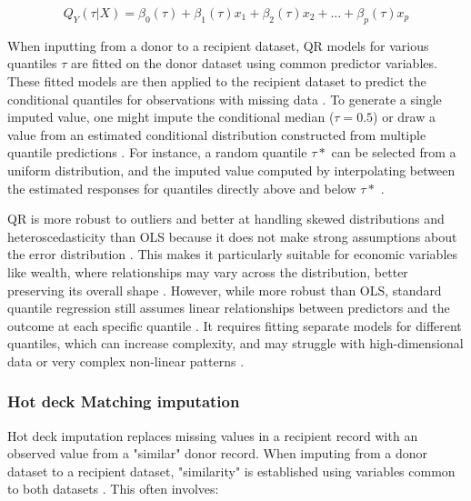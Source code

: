 $$Q_{Y}(\tau|X) = \beta_0(\tau) + \beta_1(\tau)x_1 + \beta_2(\tau)x_2 + ... + \beta_p(\tau)x_p$$

When inputting from a donor to a recipient dataset, QR models for various quantiles $\tau$ are fitted on the donor dataset using common predictor variables. These fitted models are then applied to the recipient dataset to predict the conditional quantiles for observations with missing data \citep{parker_missing}. To generate a single imputed value, one might impute the conditional median ($\tau=0.5$) or draw a value from an estimated conditional distribution constructed from multiple quantile predictions \citep{wei2014multiple}. For instance, a random quantile $\tau*$ can be selected from a uniform distribution, and the imputed value computed by interpolating between the estimated responses for quantiles directly above and below $\tau*$ \citep{chen2007confidentiality}.

QR is more robust to outliers and better at handling skewed distributions and heteroscedasticity than OLS because it does not make strong assumptions about the error distribution \citep{zhao2023quantile}. This makes it particularly suitable for economic variables like wealth, where relationships may vary across the distribution, better preserving its overall shape \citep{kleinke2020multiple}. However, while more robust than OLS, standard quantile regression still assumes linear relationships between predictors and the outcome at each specific quantile \citep{meinshausen2006quantile}. It requires fitting separate models for different quantiles, which can increase complexity, and may struggle with high-dimensional data or very complex non-linear patterns \citep{meinshausen2006quantile}.

\subsubsection{Hot deck Matching imputation}

Hot deck imputation replaces missing values in a recipient record with an observed value from a "similar" donor record. When imputing from a donor dataset to a recipient dataset, "similarity" is established using variables common to both datasets \citep{dorazio2021statistical}. This often involves:  

